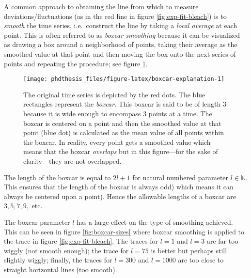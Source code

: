 \documentclass[12pt,]{book}
\theoremstyle{definition}
\theoremstyle{definition}
\theoremstyle{definition}
\theoremstyle{remark}
\begin{document}
A common approach to obtaining the line from which to measure
deviations/fluctuations (as in the red line in figure
\ref{fig:exp-fit-bleach}) is to \emph{smooth} the time series,
i.e.~construct the line by taking a \emph{local average} at each point.
This is often referred to as \emph{boxcar smoothing} because it can be
visualized as drawing a box around a neighborhood of points, taking
their average as the smoothed value at that point and then moving the
box onto the next series of points and repeating the procedure; see
figure \ref{fig:boxcar-explanation}.










\begin{figure}

\texttt{[image: phdthesis\_files/figure-latex/boxcar-explanation-1]} \hfill{}

\caption{The original time series is depicted by
the red dots. The blue rectangles represent the \emph{boxcar}. This
boxcar is said to be of length 3 because it is wide enough to encompass
3 points at a time. The boxcar is centered on a point and then the
smoothed value at that point (blue dot) is calculated as the mean value
of all points within the boxcar. In reality, every point gets a smoothed
value which means that the boxcar \emph{overlaps} but in this
figure---for the sake of clarity---they are not overlapped.}\label{fig:boxcar-explanation}
\end{figure}

The length of the boxcar is equal to \(2l + 1\) for natural numbered
parameter \(l \in \mathbb{N}\). This ensures that the length of the
boxcar is always odd) which means it can always be centered upon a
point). Hence the allowable lengths of a boxcar are \(3,5,7,9,\) etc.

The boxcar parameter \(l\) has a large effect on the type of smoothing
achieved. This can be seen in figure \ref{fig:boxcar-sizes} where boxcar
smoothing is applied to the trace in figure \ref{fig:exp-fit-bleach}.
The traces for \(l=1\) and \(l=3\) are far too wiggly (not smooth
enough); the trace for \(l=75\) is better but perhaps still slightly
wiggly; finally, the traces for \(l=300\) and \(l=1000\) are too close
to straight horizontal lines (too smooth).
\end{document}
